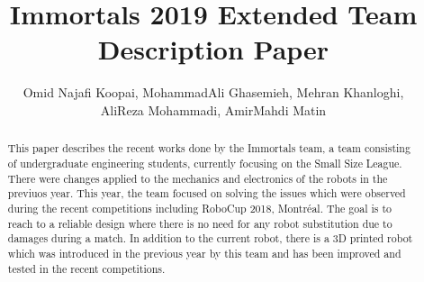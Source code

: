 \documentclass[runningheads,a4paper]{llncs}
\title{Immortals 2019 Extended Team Description Paper}
\author{\normalsize Omid Najafi Koopai{\textsupsub{\small\texttt{1}}{}}, 
MohammadAli Ghasemieh{\textsupsub{\small\texttt{2}}{}}, 
Mehran Khanloghi{\textsupsub{\small\texttt{3}}{}}, \\
\normalsize AliReza Mohammadi{\textsupsub{\small\texttt{3}}{}}, 
AmirMahdi Matin{\textsupsub{\small\texttt{3}}{}}
}
\institute{Sharif University of Technology, \\
\texttt{http://devoted-web-site.url}}
\begin{document}
\maketitle


%
%

\begin{abstract}
This paper describes the recent works done by the Immortals team, a team consisting of undergraduate engineering students, currently focusing on the Small Size League. There were changes applied to the mechanics and electronics of the robots in the previuos year. This year, the team focused on solving the issues which were observed during the recent competitions including RoboCup 2018, Montréal. The goal is to reach to a reliable design where there is no need for any robot substitution due to damages during a match. In addition to the current robot, there is a 3D printed robot which was introduced in the previous year by this team and has been improved and tested in the recent competitions.

\end{abstract}


\justify
\end{document}
